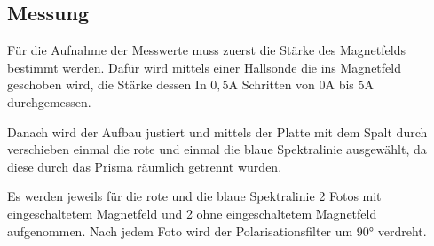 \subsection{Messung}
Für die Aufnahme der Messwerte muss zuerst die Stärke des Magnetfelds bestimmt werden. Dafür wird mittels einer Hallsonde die ins Magnetfeld geschoben wird, die Stärke dessen In
$0,5$A Schritten von 0A bis 5A durchgemessen. 

\noindent
Danach wird der Aufbau justiert und mittels der Platte mit dem Spalt durch verschieben einmal die rote und einmal die blaue Spektralinie ausgewählt, da diese durch das Prisma 
räumlich getrennt wurden. 

\noindent
Es werden jeweils für die rote und die blaue Spektralinie 2 Fotos mit eingeschaltetem Magnetfeld und 2 ohne eingeschaltetem Magnetfeld aufgenommen. Nach jedem Foto wird der Polarisationsfilter
um 90° verdreht.


